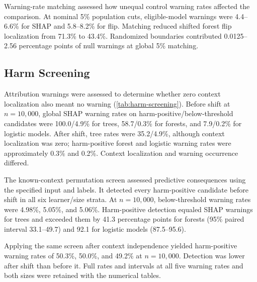 \documentclass[conference]{IEEEtran}
\begin{document}
Warning-rate matching assessed how unequal control warning rates affected the comparison. At nominal 5\% population cuts, eligible-model warnings were 4.4--6.6\% for SHAP and 5.8--8.2\% for flip. Matching reduced shifted forest flip localization from 71.3\% to 43.4\%. Randomized boundaries contributed 0.0125--2.56 percentage points of null warnings at global 5\% matching.

\subsection{Harm Screening}
Attribution warnings were assessed to determine whether zero context localization also meant no warning (\cref{tab:harm-screening}). Before shift at $n=10{,}000$, global SHAP warning rates on harm-positive/below-threshold candidates were 100.0/4.9\% for trees, 58.7/0.3\% for forests, and 7.9/0.2\% for logistic models. After shift, tree rates were 35.2/4.9\%, although context localization was zero; harm-positive forest and logistic warning rates were approximately 0.3\% and 0.2\%. Context localization and warning occurrence differed.

\begin{table}[!t]
\centering
\caption{Harm screening at globally matched 5\% empirical eligible-model warnings, $n=10{,}000$. Entries are warning percentages with pointwise 95\% paired bank/case bootstrap intervals. $H^+$ denotes $H_i\geq0.05$ and $H^-$ denotes $H_i<0.05$. SHAP and flip search all outside features; permutation F1 knows $C$. Counts are 46/154, 100/100, and 150/50. Matching is retrospective; 100\% with a degenerate bootstrap interval is not a population sensitivity guarantee.}
\label{tab:harm-screening}
\footnotesize

\end{table}

The known-context permutation screen assessed predictive consequences using the specified input and labels. It detected every harm-positive candidate before shift in all six learner/size strata. At $n=10{,}000$, below-threshold warning rates were 4.98\%, 5.05\%, and 5.06\%. Harm-positive detection equaled SHAP warnings for trees and exceeded them by 41.3 percentage points for forests (95\% paired interval 33.1--49.7) and 92.1 for logistic models (87.5--95.6).

Applying the same screen after context independence yielded harm-positive warning rates of 50.3\%, 50.0\%, and 49.2\% at $n=10{,}000$. Detection was lower after shift than before it. Full rates and intervals at all five warning rates and both sizes were retained with the numerical tables.
\end{document}

